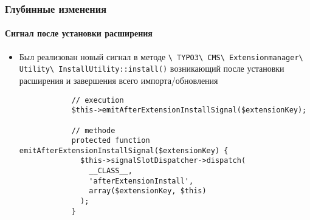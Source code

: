 \begin{frame}[fragile]
	\frametitle{Глубинные изменения}
	\framesubtitle{Сигнал после установки расширения}

	\lstset{basicstyle=\tiny\ttfamily}

	\begin{itemize}

		\item Был реализован новый сигнал в методе
			\smaller
				\texttt{\textbackslash
					TYPO3\textbackslash
					CMS\textbackslash
					Extensionmanager\textbackslash
					Utility\textbackslash
					InstallUtility::install()}
			\normalsize
			возникающий после установки расширения и завершения всего импорта/обновления

		\begin{lstlisting}
			// execution
			$this->emitAfterExtensionInstallSignal($extensionKey);

			// methode
			protected function emitAfterExtensionInstallSignal($extensionKey) {
			  $this->signalSlotDispatcher->dispatch(
			    __CLASS__,
			    'afterExtensionInstall',
			    array($extensionKey, $this)
			  );
			}
		\end{lstlisting}

	\end{itemize}

\end{frame}


